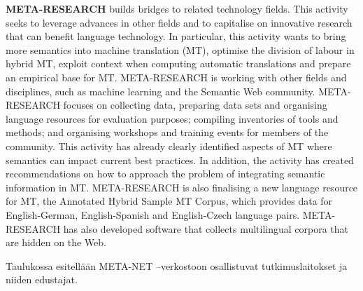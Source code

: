 \documentclass[]{../../metanetpaper}
\begin{document}
\begin{multicols}{2}
\textbf{META-RESEARCH} builds bridges to related technology
fields. This activity seeks to leverage advances in other fields and
to capitalise on innovative research that can benefit language
technology. In particular, this activity wants to bring more semantics
into machine translation (MT), optimise the division of labour in
hybrid MT, exploit context when computing automatic translations and
prepare an empirical base for MT. META-RESEARCH is working with other
fields and disciplines, such as machine learning and the Semantic Web
community.  META-RESEARCH focuses on collecting data, preparing data
sets and organising language resources for evaluation purposes;
compiling inventories of tools and methods; and organising workshops
and training events for members of the community. This activity has
already clearly identified aspects of MT where semantics can impact
current best practices. In addition, the activity has created
recommendations on how to approach the problem of integrating semantic
information in MT. META-RESEARCH is also finalising a new language
resource for MT, the Annotated Hybrid Sample MT Corpus, which provides
data for English-German, English-Spanish and English-Czech language
pairs. META-RESEARCH has also developed software that collects
multilingual corpora that are hidden on the Web.
\end{multicols}

\cleardoublepage

\appendix
{}

%
%
  
\cleardoublepage




Taulukossa esitellään META-NET –verkostoon osallistuvat
tutkimuslaitokset ja niiden edustajat.
\end{document}
